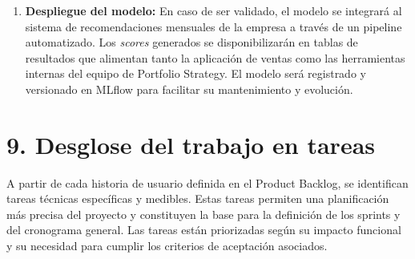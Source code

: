 \documentclass[
11pt, %
]{charter}
\begin{document}
\begin{enumerate}
\item \textbf{Despliegue del modelo:}
En caso de ser validado, el modelo se integrará al sistema de recomendaciones mensuales de la empresa a través de un pipeline automatizado. Los \textit{scores} generados se disponibilizarán en tablas de resultados que alimentan tanto la aplicación de ventas como las herramientas internas del equipo de Portfolio Strategy. El modelo será registrado y versionado en MLflow para facilitar su mantenimiento y evolución.
\end{enumerate}

\section{9. Desglose del trabajo en tareas}
\label{sec:wbs}

A partir de cada historia de usuario definida en el Product Backlog, se identifican tareas técnicas específicas y medibles. Estas tareas permiten una planificación más precisa del proyecto y constituyen la base para la definición de los sprints y del cronograma general. Las tareas están priorizadas según su impacto funcional y su necesidad para cumplir los criterios de aceptación asociados.
\end{document}
